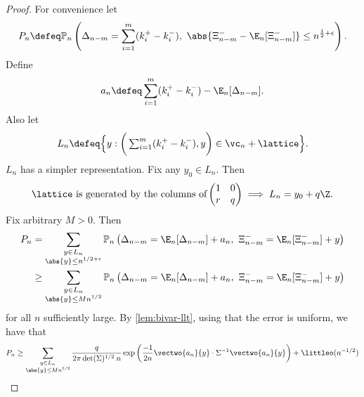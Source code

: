 \begin{proof}
    For convenience let
    \begin{equation*}
        P_n \defeq \mathbb P_n \left(
            \Delta_{n-m} = \sum_{i=1}^m (k_i^+ - k_i^-), \ 
            \abs{\Xi^-_{n-m} - \E_n[\Xi^-_{n-m}]} \leq n^{\frac{1}{2} + \epsilon}
        \right).
    \end{equation*}
    Define
    \begin{equation*}
        a_n \defeq \sum_{i=1}^m (k_i^+ - k_i^-) - \E_n[\Delta_{n-m}].
    \end{equation*}
    Also let
    \begin{equation*}
        L_n \defeq \Big\{
            y : \bigg( \textstyle\sum_{i=1}^m (k_i^+ - k_i^-), y \bigg) \in \vc_n + \lattice
            \Big\}.
    \end{equation*}
    $L_n$ has a simpler representation. Fix any $y_0 \in L_n$. Then
    \begin{equation*}
        \text{$\lattice$ is generated by the columns of} \begin{pmatrix}
            1 & 0 \\
            r & q
        \end{pmatrix}
        \implies L_n = y_0 + q \Z.
    \end{equation*}
    Fix arbitrary $M > 0$. Then
    \begin{align*}
        P_n &= \sum_{\substack{y \in L_n \\ \abs{y} \leq n^{1/2 + \epsilon}}} \mathbb P_n \left( \Delta_{n-m} = \E_n[\Delta_{n-m}] + a_n, \ \Xi^-_{n-m} = \E_n[\Xi^-_{n-m}] + y \right) \\
        &\geq \sum_{\substack{y \in L_n \\ \abs{y} \leq M n^{1/2}}} \mathbb P_n \left( \Delta_{n-m} = \E_n[\Delta_{n-m}] + a_n, \ \Xi^-_{n-m} = \E_n[\Xi^-_{n-m}] + y \right)
    \end{align*}
    for all $n$ sufficiently large. By \cref{lem:bivar-llt}, using that the error is uniform, we have that
    \begin{equation*}
        P_n \geq \sum_{\substack{y \in L_n \\ \abs{y} \leq M n^{1/2}}} 
         \frac{q}{2\pi \det(\Sigma)^{1/2} \: n} \exp\left( 
            \frac{-1}{2n} \vectwo{a_n}{y} \cdot \Sigma^{-1} \vectwo{a_n}{y}
         \right)
         + \littleo( n^{-1/2} )
    \end{equation*}


\end{proof}

